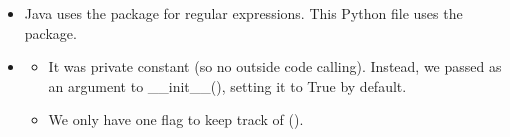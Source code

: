 \documentclass[letterpaper,10pt,english]{sphinxmanual}
\begin{document}
\begin{description}
\begin{itemize}
\item {} 
\sphinxAtStartPar
Java uses the package  for regular expressions. This Python file uses the  package.

\item {} \begin{description}
\begin{itemize}
\item {} \begin{description}
\sphinxAtStartPar
It was private constant (so no outside code calling).
Instead, we passed  as an argument to \_\_init\_\_(), setting it to True by default.

\end{description}

\item {} \begin{description}
\sphinxAtStartPar
We only have one flag to keep track of ().

\end{description}

\end{itemize}

\end{description}


\end{itemize}
\end{description}
\end{document}
